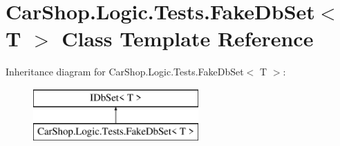 \hypertarget{class_car_shop_1_1_logic_1_1_tests_1_1_fake_db_set}{}\section{Car\+Shop.\+Logic.\+Tests.\+Fake\+Db\+Set$<$ T $>$ Class Template Reference}
\label{class_car_shop_1_1_logic_1_1_tests_1_1_fake_db_set}
Inheritance diagram for Car\+Shop.\+Logic.\+Tests.\+Fake\+Db\+Set$<$ T $>$\+:\begin{figure}[H]
\begin{center}
\leavevmode
\includegraphics[height=2.000000cm]{class_car_shop_1_1_logic_1_1_tests_1_1_fake_db_set}
\end{center}
\end{figure}
